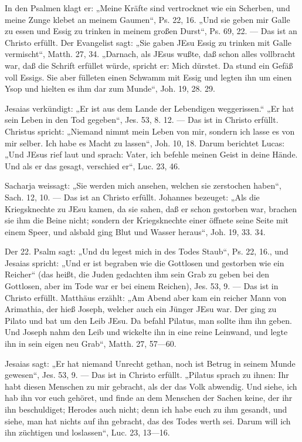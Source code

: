  In den Psalmen klagt er: „Meine Kräfte sind vertrocknet wie ein Scherben, und meine Zunge klebet an meinem Gaumen“, Ps. 22, 16. „Und sie geben mir Galle zu essen und Essig zu trinken in meinem großen Durst“, Ps. 69, 22. — Das ist an Christo erfüllt. Der Evangelist sagt: „Sie gaben JEsu Essig zu trinken mit Galle vermischt“, Matth. 27, 34. „Darnach, als JEsus wußte, daß schon alles vollbracht war, daß die Schrift erfüllet würde, spricht er: Mich dürstet. Da stund ein Gefäß voll Essigs. Sie aber fülleten einen Schwamm mit Essig und legten ihn um einen Ysop und hielten es ihm dar zum Munde“, Joh. 19, 28. 29.

 Jesaias verkündigt: „Er ist aus dem Lande der Lebendigen weggerissen.“ „Er hat sein Leben in den Tod gegeben“, Jes. 53, 8. 12. — Das ist in Christo erfüllt. Christus spricht: „Niemand nimmt mein Leben von mir, sondern ich lasse es von mir selber. Ich habe es Macht zu lassen“, Joh. 10, 18. Darum berichtet Lucas: „Und JEsus rief laut und sprach: Vater, ich befehle meinen Geist in deine Hände. Und als er das gesagt, verschied er“, Luc. 23, 46.

 Sacharja weissagt: „Sie werden mich ansehen, welchen sie zerstochen haben“, Sach. 12, 10. — Das ist an Christo erfüllt. Johannes bezeuget: „Als die Kriegsknechte zu JEsu kamen, da sie sahen, daß er schon gestorben war, brachen sie ihm die Beine nicht; sondern der Kriegsknechte einer öffnete seine Seite mit einem Speer, und alsbald ging Blut und Wasser heraus“, Joh. 19, 33. 34.

 Der 22. Psalm sagt: „Und du legest mich in des Todes Staub“, Ps. 22, 16., und Jesaias spricht: „Und er ist begraben wie die Gottlosen und gestorben wie ein Reicher“ (das heißt, die Juden gedachten ihm sein Grab zu geben bei den Gottlosen, aber im Tode war er bei einem Reichen), Jes. 53, 9. — Das ist in Christo erfüllt. Matthäus erzählt: „Am Abend aber kam ein reicher Mann von Arimathia, der hieß Joseph, welcher auch ein Jünger JEsu war. Der ging zu Pilato und bat um den Leib JEsu. Da befahl Pilatus, man sollte ihm ihn geben. Und Joseph nahm den Leib und wickelte ihn in eine reine Leinwand, und legte ihn in sein eigen neu Grab“, Matth. 27, 57—60.

 Jesaias sagt: „Er hat niemand Unrecht gethan, noch ist Betrug in seinem Munde gewesen“, Jes. 53, 9. — Das ist in Christo erfüllt. „Pilatus sprach zu ihnen: Ihr habt diesen Menschen zu mir gebracht, als der das Volk abwendig. Und siehe, ich hab ihn vor euch gehöret, und finde an dem Menschen der Sachen keine, der ihr ihn beschuldiget; Herodes auch nicht; denn ich habe euch zu ihm gesandt, und siehe, man hat nichts auf ihn gebracht, das des Todes werth sei. Darum will ich ihn züchtigen und loslassen“, Luc. 23, 13—16.

